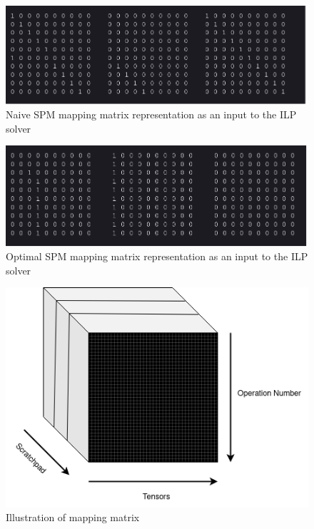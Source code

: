 \begin{figure}[th]
\centering
\includegraphics[scale=0.5]{Figures/naive_matrix_mapping.png}
\decoRule
\caption[Saved]{Naive SPM mapping matrix representation as an input to the ILP solver}
\label{fig:Saved}
\end{figure}


\begin{figure}[th]
\centering
\includegraphics[scale=0.55]{Figures/optimal_matrix_mapping.png}
\decoRule
\caption[Saved]{Optimal SPM mapping matrix representation as an input to the ILP solver}
\label{fig:Saved}
\end{figure}


\begin{figure}[th]
\centering
\includegraphics[scale=0.7]{Figures/mapping_matrix_cube.png}
\decoRule
\caption[Saved]{Illustration of mapping matrix}
\label{fig:Saved}
\end{figure}

